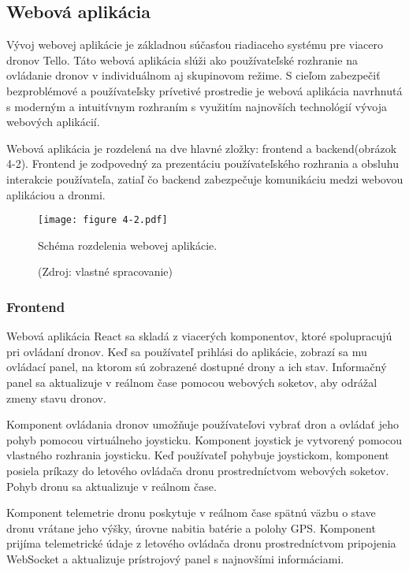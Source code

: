 \subsection{Webová aplikácia}
Vývoj webovej aplikácie je základnou súčasťou riadiaceho systému pre viacero dronov Tello. Táto webová aplikácia slúži ako používateľské rozhranie na ovládanie dronov v individuálnom aj skupinovom režime. S cieľom zabezpečiť bezproblémové a používateľsky prívetivé prostredie je webová aplikácia navrhnutá s moderným a intuitívnym rozhraním s využitím najnovších technológií vývoja webových aplikácií.

Webová aplikácia je rozdelená na dve hlavné zložky: frontend a backend(obrázok 4-2). Frontend je zodpovedný za prezentáciu používateľského rozhrania a obsluhu interakcie používateľa, zatiaľ čo backend zabezpečuje komunikáciu medzi webovou aplikáciou a dronmi.

\begin{figure}[ht!]
    \centering
    \texttt{[image: figure 4-2.pdf]}
    \caption{Schéma rozdelenia webovej aplikácie.}
    \captionsetup{font=footnotesize, justification=centering, skip=5pt}
    \caption*{(Zdroj: vlastné spracovanie)}
    \label{o:4-2}
\end{figure}  

\subsubsection{Frontend}
Webová aplikácia React sa skladá z viacerých komponentov, ktoré spolupracujú pri ovládaní dronov. Keď sa používateľ prihlási do aplikácie, zobrazí sa mu ovládací panel, na ktorom sú zobrazené dostupné drony a ich stav. Informačný panel sa aktualizuje v reálnom čase pomocou webových soketov, aby odrážal zmeny stavu dronov.

Komponent ovládania dronov umožňuje používateľovi vybrať dron a ovládať jeho pohyb pomocou virtuálneho joysticku. Komponent joystick je vytvorený pomocou vlastného rozhrania joysticku. Keď používateľ pohybuje joystickom, komponent posiela príkazy do letového ovládača dronu prostredníctvom webových soketov. Pohyb dronu sa aktualizuje v reálnom čase.

Komponent telemetrie dronu poskytuje v reálnom čase spätnú väzbu o stave dronu vrátane jeho výšky, úrovne nabitia batérie a polohy GPS. Komponent prijíma telemetrické údaje z letového ovládača dronu prostredníctvom pripojenia WebSocket a aktualizuje prístrojový panel s najnovšími informáciami.

